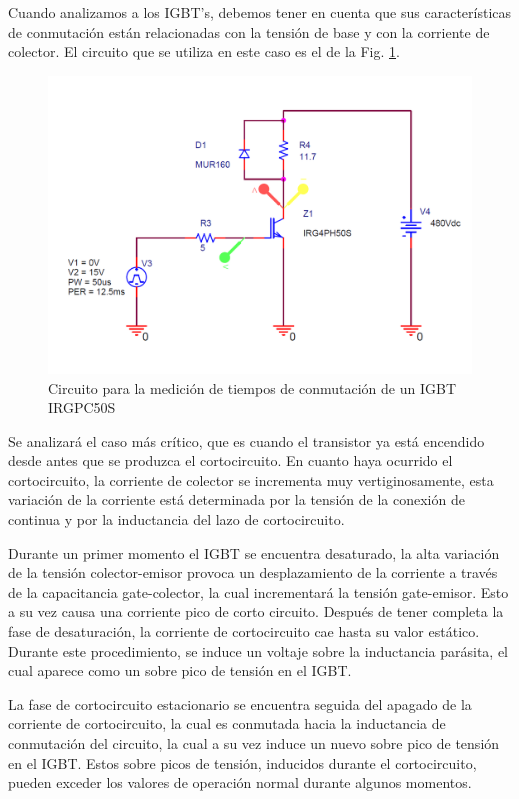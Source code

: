 \documentclass[conference]{IEEEtran}
\begin{document}
Cuando analizamos a los IGBT's, debemos tener en cuenta que sus características de conmutación están relacionadas con la tensión de base y con la corriente de colector. El circuito que se utiliza en este caso es el de la Fig. \ref{fig:circuit_igbt}.

\begin{figure}[H]
	\centering
	\includegraphics[width=\columnwidth]{imagenes/circuit_igbt}
	\caption{Circuito para la medición de tiempos de conmutación de un IGBT IRGPC50S}
	\label{fig:circuit_igbt}
\end{figure}

Se analizará el caso más crítico, que es cuando el transistor ya está encendido desde antes que se produzca el cortocircuito. En cuanto haya ocurrido el cortocircuito, la corriente de colector se incrementa muy vertiginosamente, esta variación de la corriente está determinada por la tensión de la conexión de continua y por la inductancia del lazo de cortocircuito.

Durante un primer momento el IGBT se encuentra desaturado, la alta variación de la tensión  colector-emisor provoca un desplazamiento de la corriente a través de la capacitancia gate-colector, la cual incrementará la tensión gate-emisor. Esto a su vez causa una corriente pico de corto circuito.
Después de tener completa la fase de desaturación, la corriente de cortocircuito cae hasta su valor estático. Durante este procedimiento, se induce un voltaje sobre la inductancia parásita, el cual aparece como un sobre pico de tensión en el IGBT. 

La fase de cortocircuito estacionario se encuentra seguida del apagado de la corriente de cortocircuito, la cual es conmutada hacia la inductancia de conmutación del circuito, la cual a su vez induce un nuevo sobre pico de tensión en el IGBT.
Estos sobre picos de tensión, inducidos durante el cortocircuito, pueden exceder los valores de operación normal durante algunos momentos. 
\end{document}
